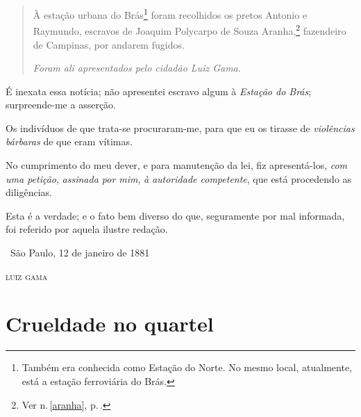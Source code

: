{\begin{quote}
À estação urbana do Brás\footnote{Também era conhecida como Estação
  do Norte. No mesmo local, atualmente, está a estação ferroviária do
  Brás.} foram recolhidos os pretos Antonio e Raymundo, escravos de
Joaquim Polycarpo de Souza Aranha,\footnote{Ver n.\,\ref{aranha}, p.\,\pageref{aranha}.}
fazendeiro de Campinas, por
andarem fugidos.

\emph{Foram ali apresentados pelo cidadão Luiz Gama}.
\end{quote}

É inexata essa notícia; não apresentei escravo algum à \emph{Estação do
Brás}; surpreende-me a asserção.

Os indivíduos de que trata-se procuraram-me, para que eu os tirasse de
\emph{violências bárbaras} de que eram vítimas.

No cumprimento do meu dever, e para manutenção da lei, fiz
apresentá-los, \emph{com uma petição}, \emph{assinada por mim}, \emph{à}
\emph{autoridade competente}, que está procedendo as diligências.

Esta é a verdade; e o fato bem diverso do que, seguramente por mal
informada, foi referido por aquela ilustre redação.

\medskip

\hfill\ São Paulo, 12 de janeiro de 1881

\hfill\textsc{luiz gama}

\part{Crueldade no quartel}

}

